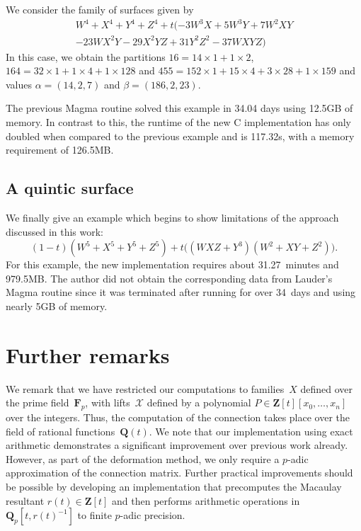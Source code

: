 We consider the family of surfaces given by
\begin{multline*}
W^4 + X^4 + Y^4 + Z^4 + t (-3 W^3 X + 5 W^3 Y + 7 W^2 X Y \\ 
                           - 23 W X^2 Y - 29 X^2 Y Z + 31 Y^2 Z^2 - 37 W X Y Z)
\end{multline*}
In this case, we obtain the partitions $16 = 14 \times 1 + 1 \times 2$, 
$164 = 32 \times 1 + 1 \times 4 + 1 \times 128$ and 
$455 = 152 \times 1 + 15 \times 4 + 3 \times 28 + 1 \times 159$ and 
values $\alpha = (14,2,7)$ and $\beta = (186,2,23)$.

The previous {\sc Magma} routine solved this example in 34.04 days using 
12.5GB of memory.  In contrast to this, the runtime of the new C 
implementation has only doubled when compared to the previous example and is 
117.32s, with a memory requirement of 126.5MB.

\subsection{A quintic surface}

We finally give an example which begins to show limitations of the approach 
discussed in this work:
\begin{equation*}
(1-t) (W^5 + X^5 + Y^5 + Z^5) + t \bigl((W X Z + Y^3) (W^2 + X Y + Z^2)\bigr).
\end{equation*}
For this example, the new implementation requires about 31.27~minutes and 
979.5MB.  The author did not obtain the corresponding data from Lauder's 
{\sc Magma} routine since it was terminated after running for over 34~days and 
using nearly 5GB of memory.


\section{Further remarks}

We remark that we have restricted our computations to families~$X$ 
defined over the prime field~$\mathbf{F}_p$, with lifts~$\mathcal{X}$ 
defined by a polynomial $P \in \mathbf{Z}[t][x_0,\dotsc,x_n]$ over 
the integers.  Thus, the computation of the connection takes place 
over the field of rational functions~$\mathbf{Q}(t)$.  We note that 
our implementation using exact arithmetic demonstrates a significant 
improvement over previous work already.  However, as part of the 
deformation method, we only require a $p$-adic approximation of the 
connection matrix.  Further practical improvements should be possible 
by developing an implementation that precomputes the Macaulay resultant 
$r(t) \in \mathbf{Z}[t]$ and then performs arithmetic operations 
in~$\mathbf{Q}_p[t, r(t)^{-1}]$ to finite $p$-adic precision.

